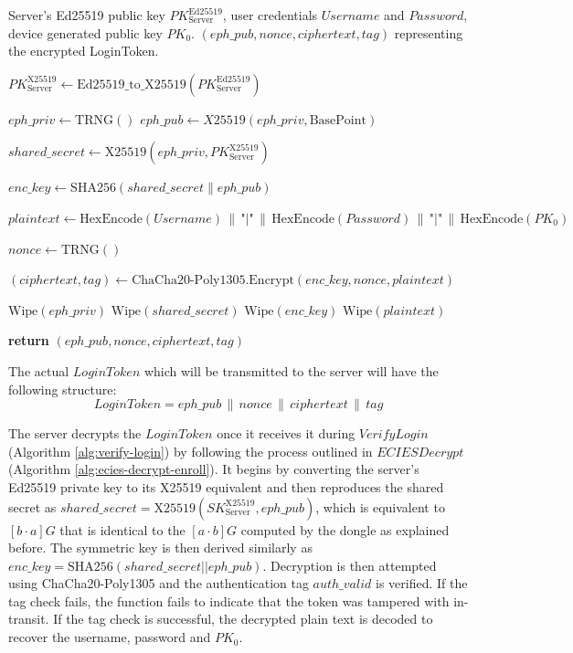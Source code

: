 \begin{algorithm}[ht!]
\caption{$ECIESEncrypt(PK_{\text{Server}}^{\text{Ed25519}}, Username, Password, PK_0)$}
\begin{algorithmic}[1]
    \Require Server's Ed25519 public key $PK_{\text{Server}}^{\text{Ed25519}}$, user credentials $Username$ and $Password$, device generated public key $PK_{\text{0}}$.
    \Ensure  $(eph\_pub, nonce, ciphertext, tag)$ representing the encrypted LoginToken.

    \State $PK_{\text{Server}}^{\text{X25519}} \leftarrow \text{Ed25519\_to\_X25519}(PK_{\text{Server}}^{\text{Ed25519}})$

    \State $eph\_priv \leftarrow \text{TRNG}()$ 
    \State $eph\_pub \leftarrow X25519(eph\_priv, \text{BasePoint})$ 

    \State $shared\_secret \leftarrow \text{X25519}(eph\_priv, PK_{\text{Server}}^{\text{X25519}})$

    \State $enc\_key \leftarrow \text{SHA256}(shared\_secret \mathbin\| eph\_pub)$

    \State $plaintext \leftarrow \text{HexEncode}(Username) \,\|\, \texttt{"|"} \,\|\, \text{HexEncode}(Password) \,\|\, \texttt{"|"} \,\|\, \text{HexEncode}(PK_0)$

    \State $nonce \leftarrow \text{TRNG}()$ 

    \State $(ciphertext, tag) \leftarrow \text{ChaCha20-Poly1305.Encrypt}(enc\_key, nonce, plaintext)$

    \State $\text{Wipe}(eph\_priv)$
    \State $\text{Wipe}(shared\_secret)$
    \State $\text{Wipe}(enc\_key)$
    \State $\text{Wipe}(plaintext)$

    \State \textbf{return} $(eph\_pub, nonce, ciphertext, tag)$
\end{algorithmic}
\label{alg:ecies-encrypt-enroll}
\end{algorithm}

The actual $LoginToken$ which will be transmitted to the server will have the following structure:
$$
LoginToken = eph\_pub \,\|\, nonce \,\|\, ciphertext \,\|\, tag
$$

The server decrypts the $LoginToken$ once it receives it during $VerifyLogin$ (Algorithm \ref{alg:verify-login}) by following the process outlined in $ECIESDecrypt$ (Algorithm \ref{alg:ecies-decrypt-enroll}). It begins by converting the server's Ed25519 private key to its X25519 equivalent and then reproduces the shared secret as $shared\_secret=\text{X25519}(SK_{\text{Server}}^{\text{X25519}},eph\_pub)$, which is equivalent to $[b \cdot a]G$ that is identical to the $[a \cdot b]G$ computed by the dongle as explained before. The symmetric key is then derived similarly as $enc\_key=\text{SHA256}(shared\_secret||eph\_pub)$. Decryption is then attempted using ChaCha20-Poly1305 and the authentication tag $auth\_valid$ is verified. If the tag check fails, the function fails to indicate that the token was tampered with in-transit. If the tag check is successful, the decrypted plain text is decoded to recover the username, password and $PK_0$. 

